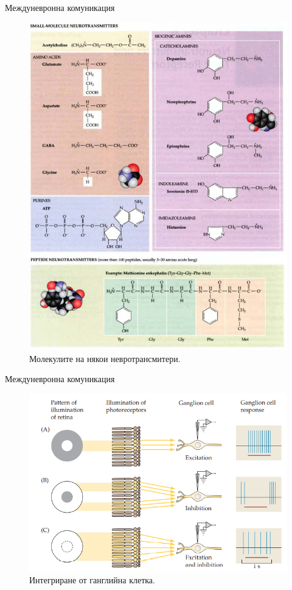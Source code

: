 \begin{frame}[t]{Междуневронна комуникация}
  \begin{figure}[htbp!]
    \centering
    \includegraphics[width=\textwidth,height=0.7\textheight,keepaspectratio]{img/activation/neurotransmitters.PNG}
    \caption{Молекулите на някои невротрансмитери. \cite[Фиг 6.1]{Neuroscience}}
  \end{figure}
\end{frame}

\begin{frame}[t]{Междуневронна комуникация}
  \begin{figure}[htbp!]
    \centering
    \includegraphics[width=\textwidth,height=0.7\textheight,keepaspectratio]{img/activation/gangleon-integration.PNG}
    \caption{Интегриране от ганглийна клетка. \cite[Фиг 1.16]{Neuron}}
  \end{figure}
\end{frame}

